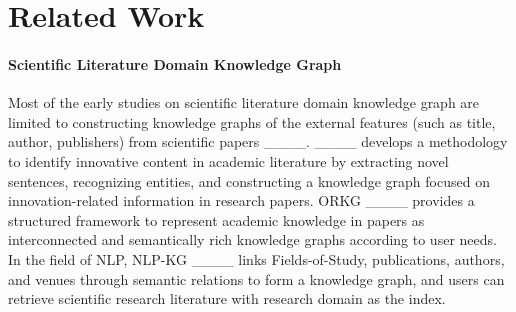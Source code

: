 \section{Related Work}
\paragraph{Scientific Literature Domain Knowledge Graph} 
 Most of the early studies on scientific literature domain knowledge graph are limited to constructing knowledge graphs of the external features (such as title, author, publishers) from scientific papers ____. ____ develops a methodology to identify innovative content in academic literature by extracting novel sentences, recognizing entities, and constructing a knowledge graph focused on innovation-related information in research papers.
 ORKG ____ provides a structured framework to represent academic knowledge in papers as interconnected and semantically rich knowledge graphs according to user needs. In the field of NLP, NLP-KG ____ links Fields-of-Study, publications, authors, and venues through semantic relations to form a knowledge graph, and users can retrieve scientific research literature with research domain as the index.
